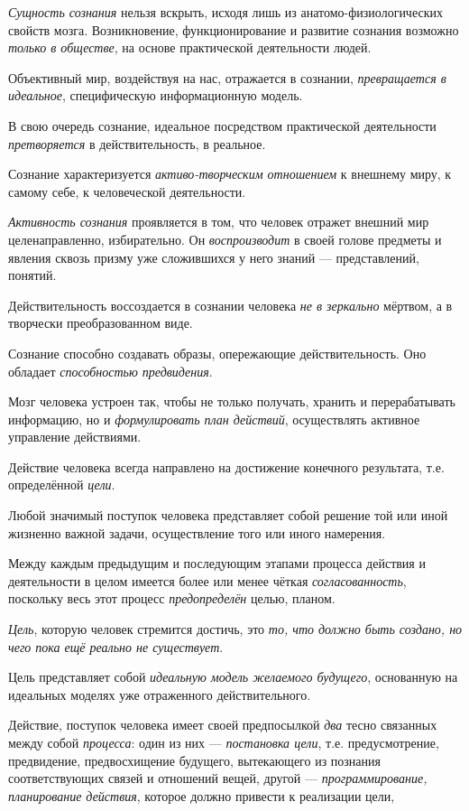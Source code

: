 \documentclass[a4paper,14pt,russian]{extreport}
\begin{document}
\emph{Сущность сознания} нельзя вскрыть, исходя лишь из анатомо-физиологических свойств мозга. Возникновение, функционирование и развитие сознания возможно \emph{только в обществе}, на основе практической деятельности людей.

Объективный мир, воздействуя на нас, отражается в сознании, \emph{превращается в идеальное}, специфическую информационную модель.

В свою очередь сознание, идеальное посредством практической деятельности \emph{претворяется} в действительность, в реальное.

Сознание характеризуется \emph{активо-творческим отношением} к внешнему миру, к самому себе, к человеческой деятельности.

\emph{Активность сознания} проявляется в том, что человек отражет внешний мир целенаправленно, избирательно. Он \emph{воспроизводит} в своей голове предметы и явления сквозь призму уже сложившихся у него знаний --- представлений, понятий.

Действительность воссоздается в сознании человека \emph{не в зеркально} мёртвом, а в творчески преобразованном виде.

Сознание способно создавать образы, опережающие действительность. Оно обладает \emph{способностью предвидения}.

Мозг человека устроен так, чтобы не только получать, хранить и перерабатывать информацию, но и \emph{формулировать план действий}, осуществлять активное управление действиями.

Действие человека всегда направлено на достижение конечного результата, т.е. определённой \emph{цели}.

Любой значимый поступок человека представляет собой решение той или иной жизненно важной задачи, осуществление того или иного намерения.

Между каждым предыдущим и последующим этапами процесса действия и деятельности в целом имеется более или менее чёткая \emph{согласованность}, поскольку весь этот процесс \emph{предопределён} целью, планом.

\emph{Цель}, которую человек стремится достичь, это \emph{то, что должно быть создано, но чего пока ещё реально не существует}.

Цель представляет собой \emph{идеальную модель желаемого будущего}, основанную на идеальных моделях уже отраженного действительного.

Действие, поступок человека имеет своей предпосылкой \emph{два} тесно связанных между собой \emph{процесса}: один из них --- \emph{постановка цели}, т.е. предусмотрение, предвидение, предвосхищение будущего, вытекающего из познания соответствующих связей и отношений вещей, другой --- \emph{программирование, планирование действия}, которое должно привести к реализации цели,
\end{document}
